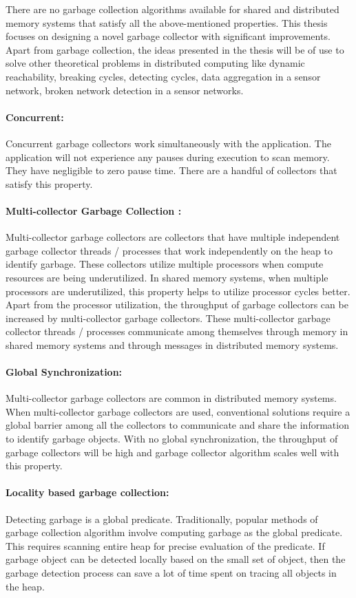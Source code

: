 There are no garbage collection algorithms available for shared and distributed memory systems that satisfy all the above-mentioned properties.  This thesis focuses on designing a novel garbage collector with significant improvements. Apart from garbage collection, the ideas presented in the thesis will be of use to solve other theoretical problems in distributed computing like dynamic reachability, breaking cycles, detecting cycles, data aggregation in a sensor network, broken network detection in a sensor networks.


\paragraph{Concurrent:}
Concurrent garbage collectors work simultaneously with the application. The application will not experience any pauses during execution to scan memory. They
have negligible to zero pause time. There are a handful of collectors that satisfy this property. 
\paragraph{Multi-collector Garbage Collection :}
Multi-collector garbage collectors are collectors that have multiple independent garbage collector threads / processes that work independently on the heap to identify garbage. These collectors utilize multiple processors when compute resources are being underutilized. In shared memory systems, when multiple processors are underutilized, this property helps to utilize processor cycles better. Apart from the processor utilization, the throughput of garbage collectors can be increased by multi-collector garbage collectors. These multi-collector garbage collector threads / processes communicate among themselves through memory in shared memory systems and through messages in distributed memory systems.
\paragraph{Global Synchronization:}
Multi-collector garbage collectors are common in distributed memory systems. 
When multi-collector garbage collectors are used, conventional solutions require a global barrier among all the collectors to communicate and share the information to identify garbage objects. With no global synchronization, the throughput of garbage collectors will be high and garbage collector algorithm scales well with this property.
\paragraph{Locality based garbage collection:}
Detecting garbage is a global predicate. Traditionally, popular methods of garbage collection algorithm involve computing garbage as the global predicate. This requires scanning entire heap for precise evaluation of the predicate. If garbage object can be detected locally based on the small set of object, then the garbage detection process can save a lot of time spent on tracing all objects in the heap.
